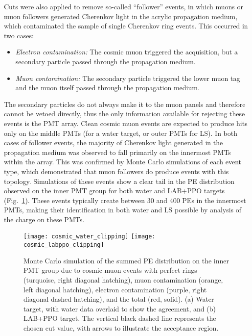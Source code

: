 Cuts were also applied to remove so-called ``follower'' events, in which muons or muon followers generated Cherenkov light in the acrylic propagation medium, which contaminated the sample of single Cherenkov ring events.  This occurred in two cases: 
\begin{itemize}
\item \emph{Electron contamination:} The cosmic muon triggered the acquisition, but a secondary particle passed through the propagation medium.
\item \emph{Muon contamination:} The secondary particle triggered the lower muon tag and the muon itself passed through the propagation medium.  
\end{itemize}
The secondary particles do not always make it to the muon panels and therefore cannot be vetoed directly, thus the only information available for rejecting these events is the PMT array.  
Clean cosmic muon events are expected to produce hits only on the middle PMTs (for a water target, or outer PMTs for LS).
In both cases of follower events, the majority of Cherenkov light generated in the propagation medium was observed 
to fall primarily on the innermost PMTs within the array.  This was confirmed by Monte Carlo simulations of each event type, which 
demonstrated that muon followers do produce events with this topology.   
Simulations of these events show a clear tail in the PE distribution observed on the inner PMT group for both water and LAB+PPO targets (Fig.~\ref{f:clipMC}).  
These events 
typically create between 30 and 400 PEs in the innermost PMTs, making their identification in both water and LS possible by analysis of the charge on these PMTs.  

\begin{figure}
\centering
\texttt{[image: cosmic\_water\_clipping]}
\texttt{[image: cosmic\_labppo\_clipping]}
\caption{ Monte Carlo simulation of the summed PE distribution on the inner PMT group due to cosmic muon events with perfect rings (turquoise, right diagonal hatching), muon contamination (orange, left diagonal hatching), electron contamination (purple, right diagonal dashed hatching), and the total (red, solid).  (a) Water target, with water data overlaid to show the agreement, and (b) LAB+PPO target.  The vertical black dashed line represents the chosen cut value, with arrows to illustrate the acceptance region.}
\label{f:clipMC}
\end{figure}

